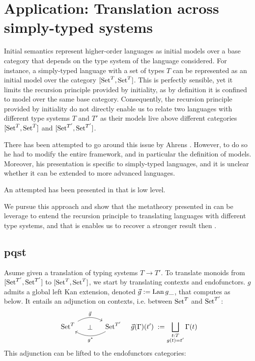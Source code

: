 \section{Application: Translation across simply-typed systems}

Initial semantics represent higher-order languages
as initial models over a base category that depends on the type system of
the language considered.
For instance, a simply-typed language with a set of types $T$ can be
represented as an initial model over the category $[\operatorname{Set}^T,\operatorname{Set}^T]$.
This is perfectly sensible, yet it limits the recursion principle provided
by initiality, as by definition it is confined to model over the same base
category.
Consequently, the recursion principle provided by initiality do
not directly enable us to relate two languages with different type
systems $T$ and $T'$ as their models live above different categories
$[\operatorname{Set}^T,\operatorname{Set}^T]$ and $[\operatorname{Set}^{T'},\operatorname{Set}^{T'}]$.

\vspace{3cm}

There has been attempted to go around this issue by Ahrens \cite{ExtendedInitiality12}.
However, to do so he had to modify the entire framework, and in particular
the definition of models.
Moreover, his presentation is specific to simply-typed languages, and it is
unclear whether it can be extended to more advanced languages.


An attempted has been presented in \cite{IntroductionIS24} that is low level.

We pursue this approach and show that the metatheory presented in
 can be leverage to entend the recursion principle to
translating languages with different type systems, and that is enables us to
recover a stronger result then \cite{ExtendedInitiality12}.


\subsection{pqst}
Asume given a translation of typing systems $T \to T'$.
To translate monoids from $[\operatorname{Set}^{T'},\operatorname{Set}^{T'}]$ to $[\operatorname{Set}^T,\operatorname{Set}^T]$,
we start by translating contexts and endofunctors.
$g$ admits a global left Kan extension, denoted
$\vec{g} := \operatorname{Lan}{g}{\_}$, that computes as below.
It entails an adjunction on contexts, i.e. between $\operatorname{Set}^T$ and $\operatorname{Set}^{T'}$:
%
\begin{align*}
  \begin{tikzcd}[ampersand replacement = \&, column sep=large]
      \Set^T
          \ar[r, bend left, "\vec{g}"]
          \ar[r, phantom, "\perp"]
        \& \Set^{T'} \ar[l, bend left, "g^*"]
  \end{tikzcd}
  &&
  \vec{g}(\Gamma)(t') \;:= \bigsqcup_{\substack{t : T \\ g(t) = t'}} \Gamma(t)
\end{align*}
%
This adjunction can be lifted to the endofunctors categories:

